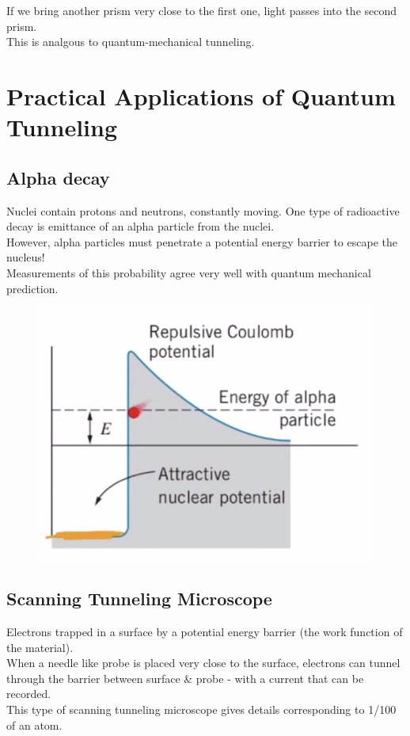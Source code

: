 \documentclass[class=article,crop=false]{standalone}
\begin{document}
If we bring another prism very close to the first one, light passes into the second prism.\\

This is analgous to quantum-mechanical tunneling.

\newpage
\section{Practical Applications of Quantum Tunneling}
\subsection{Alpha decay}
Nuclei contain protons and neutrons, constantly moving. One type of radioactive decay is emittance of an alpha particle from the nuclei.\\
However, alpha particles must penetrate a potential energy barrier to escape the nucleus!\\
Measurements of this probability agree very well with quantum mechanical prediction.


\begin{figure}[h!]
	\centering
	\includegraphics[width=0.6\linewidth]{./Images/alpha_tunneling.png}
	\caption{}
\end{figure}

\subsection{Scanning Tunneling Microscope}
Electrons trapped in a surface by a potential energy barrier (the work function of the material).\\
When a needle like probe is placed very close to the surface, electrons can tunnel through the barrier between surface \& probe - with a current that can be recorded.\\
This type of scanning tunneling microscope gives details corresponding to 1/100 of an atom.
\end{document}
